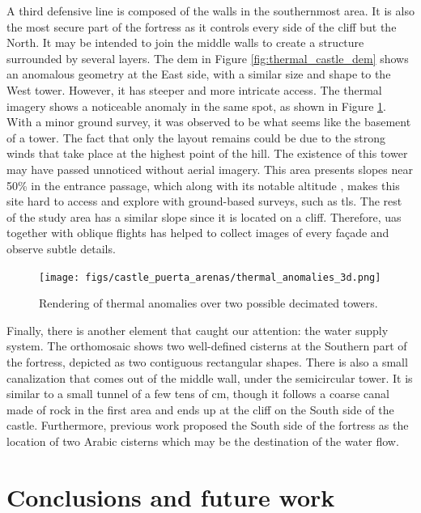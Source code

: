 A third defensive line is composed of the walls in the southernmost area. It is also the most secure part of the fortress as it controls every side of the cliff but the North. It may be intended to join the middle walls to create a structure surrounded by several layers. The \acrshort{dem} in Figure \ref{fig:thermal_castle_dem} shows an anomalous geometry at the East side, with a similar size and shape to the West tower. However, it has steeper and more intricate access. The thermal imagery shows a noticeable anomaly in the same spot, as shown in Figure \ref{fig:cistern_tower}. With a minor ground survey, it was observed to be what seems like the basement of a tower. The fact that only the layout remains could be due to the strong winds that take place at the highest point of the hill. The existence of this tower may have passed unnoticed without aerial imagery. This area presents slopes near 50\% in the entrance passage, which along with its notable altitude \cite{modrego-fernandez_propuesta_2022}, makes this site hard to access and explore with ground-based surveys, such as \acrshort{tls}. The rest of the study area has a similar slope since it is located on a cliff. Therefore, \acrshort{uas} together with oblique flights has helped to collect images of every façade and observe subtle details.

\begin{figure}[ht]
    \centering
    \texttt{[image: figs/castle\_puerta\_arenas/thermal\_anomalies\_3d.png]}
    \caption{Rendering of thermal anomalies over two possible decimated towers. }
    \label{fig:cistern_tower}
\end{figure}

Finally, there is another element that caught our attention: the water supply system. The orthomosaic shows two well-defined cisterns at the Southern part of the fortress, depicted as two contiguous rectangular shapes. There is also a small canalization that comes out of the middle wall, under the semicircular tower. It is similar to a small tunnel of a few tens of \si{\centi\meter}, though it follows a coarse canal made of rock in the first area and ends up at the cliff on the South side of the castle. Furthermore, previous work proposed the South side of the fortress as the location of two Arabic cisterns which may be the destination of the water flow.  
\section{Conclusions and future work}

